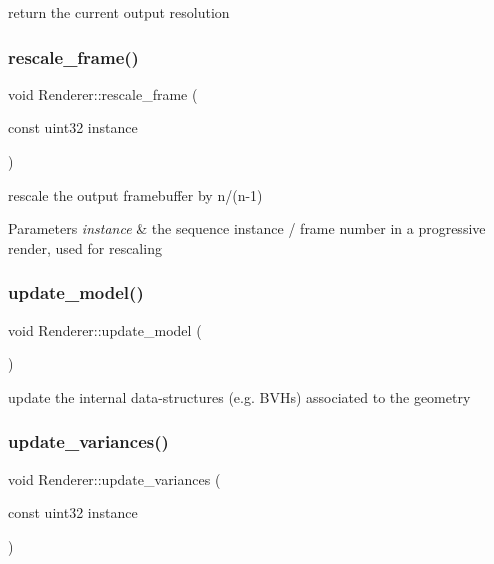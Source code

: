 return the current output resolution \mbox{\label{struct_renderer_aea918ac9f9dd97326243016369d82598}} 
\subsubsection{\texorpdfstring{rescale\+\_\+frame()}{rescale\_frame()}}
{\footnotesize\ttfamily void Renderer\+::rescale\+\_\+frame (\begin{DoxyParamCaption}\item[{const uint32}]{instance }\end{DoxyParamCaption})}

rescale the output framebuffer by n/(n-\/1)


\begin{DoxyParams}{Parameters}
{\em instance} & the sequence instance / frame number in a progressive render, used for rescaling \\
\hline
\end{DoxyParams}
\mbox{\label{struct_renderer_a7056024364d5f23df8c6350e4fb1ec08}} 
\subsubsection{\texorpdfstring{update\+\_\+model()}{update\_model()}}
{\footnotesize\ttfamily void Renderer\+::update\+\_\+model (\begin{DoxyParamCaption}{ }\end{DoxyParamCaption})}

update the internal data-\/structures (e.\+g. B\+V\+Hs) associated to the geometry \mbox{\label{struct_renderer_a16d987b3115618f559ad3ce10511f3ec}} 
\subsubsection{\texorpdfstring{update\+\_\+variances()}{update\_variances()}}
{\footnotesize\ttfamily void Renderer\+::update\+\_\+variances (\begin{DoxyParamCaption}\item[{const uint32}]{instance }\end{DoxyParamCaption})}


